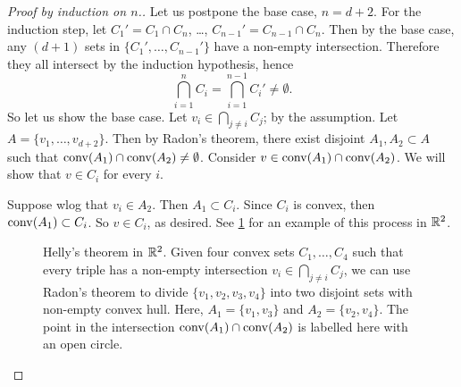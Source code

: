 \begin{proof}[Proof by induction on $n$.] 
Let us postpone the base case, $n=d+2$.
For the induction step, let $C_1' = C_1 \cap C_n$, \ldots, $C_{n-1}' = C_{n-1} \cap C_n$. Then by the base case, any $(d+1)$ sets in $\{C_1',\dotsc,C_{n-1}'\}$ have a non-empty intersection. Therefore they all intersect by the induction hypothesis, hence
\[
\bigcap_{i=1}^n C_i = \bigcap_{i=1}^{n-1}C_i' \neq \emptyset.
\]
So let us show the base case. Let $v_i \in \bigcap_{j\neq i} C_j$; by the assumption. Let $A = \{v_1,\dotsc,v_{d+2}\}$. Then by Radon's theorem, there exist disjoint $A_1,A_2\subset A$ such that $\operatorname{conv}(A_1)\cap \operatorname{conv}(A_2)\neq \emptyset$. Consider $v\in \operatorname{conv}(A_1)\cap \operatorname{conv}(A_2)$. We will show that $v\in C_i$ for every $i$.

Suppose wlog that $v_i \in A_2$. Then $A_1 \subset C_i$. Since $C_i$ is convex, then $\operatorname{conv}(A_1) \subset C_i$. So $v\in C_i$, as desired. See \cref{fig:Helly_proof} for an example of this process in $\mathbb{R}^2$. \qedhere
\begin{figure}
\begin{center}
\end{center}
\caption{Helly's theorem in $\mathbb{R}^2$. Given four convex sets $C_1,\dots,C_4$ such that every triple has a non-empty intersection $v_i \in \bigcap_{j\neq i} C_j$, we can use Radon's theorem to divide $\{v_1,v_2,v_3,v_4\}$ into two disjoint sets with non-empty convex hull. Here, $A_1 = \{v_1,v_3\}$ and $A_2 = \{v_2,v_4\}$. The point in the intersection $\operatorname{conv}(A_1)\cap \operatorname{conv}(A_2)$ is labelled here with an open circle.} \label{fig:Helly_proof}
\end{figure}
\end{proof}

